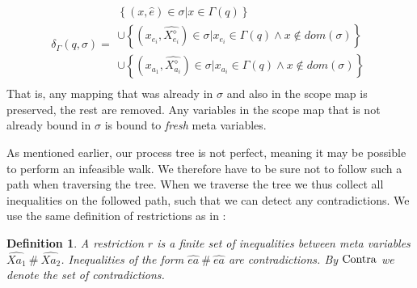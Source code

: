 \documentclass[10pt]{../sigplanconf}
\newcommand{\w}[1]{\ensuremath{\widehat{#1}}}
\newtheorem{definition}{Definition}
\begin{document}
\begin{equation*}
  \label{eq:delta}
  \delta_\Gamma(q, \sigma) =
  \begin{array}{l}
    \left\{ (x, \widehat{e}) \in \sigma | x \in \Gamma(q) \right\} \\
    \cup
    \left\{ (x_{e_i}, \widehat{X_{e_i}^\diamond}) \in \sigma \Big| x_{e_i} \in \Gamma(q) \land x \not \in dom(\sigma) \right\} \\
    \cup \left\{ (x_{a_1}, \widehat{X_{a_i}^\diamond}) \in \sigma \Big| x_{a_i} \in \Gamma(q) \land x \not \in dom(\sigma) \right\} \\
  \end{array}
\end{equation*}
That is, any mapping that was already in $\sigma$ and also in the
scope map is preserved, the rest are removed. Any variables in the
scope map that is not already bound in $\sigma$ is bound to
\emph{fresh} meta variables.

As mentioned earlier, our process tree is not perfect, meaning it may
be possible to perform an infeasible walk. We therefore have to be
sure not to follow such a path when traversing the tree. When we
traverse the tree we thus collect all inequalities on the followed
path, such that we can detect any contradictions. We use the same
definition of restrictions as in \cite{abramov2000universal}:
\begin{definition}
  A restriction $\w{r}$ is a finite set of inequalities between meta
  variables $\w{Xa_1}\ \#\ \w{Xa_2}$. Inequalities of the form
  $\w{ea}\ \#\ \w{ea}$ are \emph{contradictions}. By ${\rm Contra}$ we
  denote the set of contradictions.
\end{definition}
\end{document}
